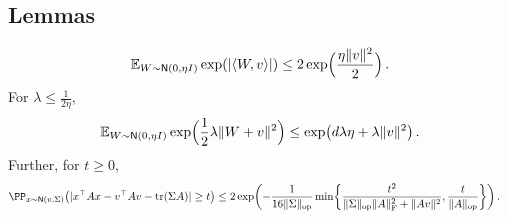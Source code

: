 \subsection{Lemmas}


\begin{lemma}\label{lem:Gaussian-vMGF}
\begin{align*}
    \En_{W\sim \normal{0,\eta\Id}} \exp\prn*{\abs{\tri{W,v}}}\leq 2\exp\prn[\Big]{\frac{\eta\nrm{v}^2}{2}}\,.
\end{align*}
For $\lambda\leq \frac{1}{2\eta}$,
\begin{align*}
    \En_{W\sim \normal{0,\eta\Id}} \exp\prn[\Big]{\frac12\lambda\nrm{W+v}^2}\leq \exp\prn[\big]{d\lambda \eta+\lambda\nrm{v}^2}\,.
\end{align*}
Further, for $t\geq 0$,
\begin{align*}
    \PP_{x\sim \normal{v,\Sigma}}\prn*{\abs{x\tp Ax-v\tp A v-\tr(\Sigma A)}\geq t}&\leq 2\exp\prn*{ -\frac{1}{16\nrmop{\Sigma}}\min\crl*{\frac{t^2}{\nrmop{\Sigma}\nrmF{A}^2+\nrm{Av}^2}, \frac{t}{\nrmop{A}} }}\,.
\end{align*}
\end{lemma}
